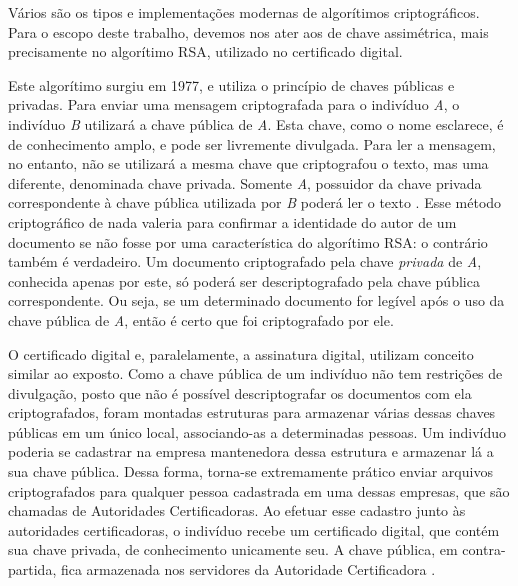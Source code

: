   Vários são os tipos e implementações modernas de algorítimos
  criptográficos. Para o escopo deste trabalho, devemos nos ater aos 
  de chave assimétrica, mais precisamente no algorítimo RSA,
  utilizado no certificado digital.\par

  Este algorítimo surgiu em 1977, e utiliza o princípio de chaves
  públicas e privadas. Para enviar uma mensagem criptografada
  para o indivíduo \emph{A}, o indivíduo \emph{B} utilizará a
  chave pública de \emph{A}. Esta chave, como o nome esclarece, é
  de conhecimento amplo, e pode ser livremente divulgada. Para
  ler a mensagem, no entanto, não se utilizará a mesma chave que
  criptografou o texto, mas uma diferente, denominada chave
  privada. Somente \emph{A}, possuidor da chave privada
  correspondente à chave pública utilizada por \emph{B} poderá
  ler o texto \cite[p. 443]{SistemasOperacionaisModernos}. Esse
  método criptográfico de nada valeria para confirmar a
  identidade do autor de um documento se não fosse por uma
  característica do algorítimo RSA: o contrário também é
  verdadeiro. Um documento criptografado pela chave
  \emph{privada} de \emph{A}, conhecida apenas por este, só
  poderá ser descriptografado pela chave pública correspondente.
  Ou seja, se um determinado documento for legível após o uso da
  chave pública de \emph{A}, então é certo que foi criptografado
  por ele.\par

  O certificado digital e, paralelamente, a assinatura digital,
  utilizam conceito similar ao exposto. Como a chave pública de
  um indivíduo não tem restrições de divulgação, posto que não é
  possível descriptografar os documentos com ela criptografados,
  foram montadas estruturas para armazenar várias dessas chaves
  públicas em um único local, associando-as a determinadas
  pessoas. Um indivíduo poderia se cadastrar na empresa
  mantenedora dessa estrutura e armazenar lá a sua chave pública.
  Dessa forma, torna-se extremamente prático enviar arquivos
  criptografados para qualquer pessoa cadastrada em uma dessas
  empresas, que são chamadas de Autoridades Certificadoras. Ao
  efetuar esse cadastro junto às autoridades certificadoras, o
  indivíduo recebe um certificado digital, que contém sua chave
  privada, de conhecimento unicamente seu. A chave pública, em
  contra-partida, fica armazenada nos servidores da Autoridade
  Certificadora \cite[p. 16]{SegredoDemocracia}.

